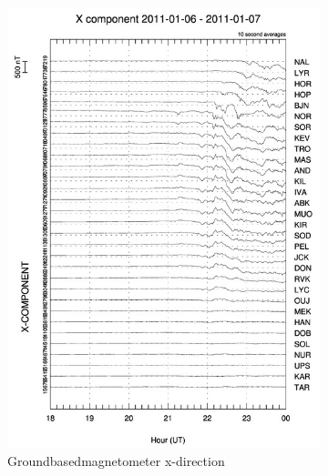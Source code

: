 \documentclass[10pt,a4paper]{article}
\begin{document}
\begin{figure}[h]
\centering
\begin{subfigure}{0.3\textwidth}
\centering
	\includegraphics[width=\textwidth]{X_gram.jpg}
	\caption{ Groundbasedmagnetometer x-direction \label{GBM_X}}
\end{subfigure}
\begin{subfigure}{0.3\textwidth}
\centering

\end{subfigure}
\end{figure}
\end{document}
